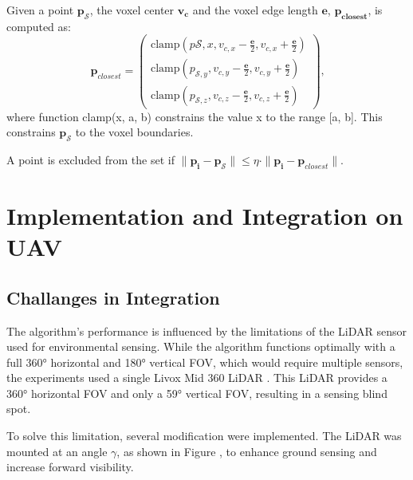             Given a point $\mathbf{p_{\mathcal{S}}}$, the voxel center $\mathbf{v_c}$ and the voxel edge length $\mathbf{e}$, $\mathbf{p_{closest}}$, is computed as: 
            \begin{equation}
                \mathbf{p}_{closest} =
                \begin{pmatrix}
                    \text{clamp}(p{\mathcal{S},x}, v_{c,x} - \frac{\mathbf{e}}{2}, v_{c,x} + \frac{\mathbf{e}}{2}) \\
                    \text{clamp}(p_{\mathcal{S},y}, v_{c,y} - \frac{\mathbf{e}}{2}, v_{c,y} + \frac{\mathbf{e}}{2}) \\
                    \text{clamp}(p_{\mathcal{S},z}, v_{c,z} - \frac{\mathbf{e}}{2}, v_{c,z} + \frac{\mathbf{e}}{2})
                \end{pmatrix}\text{,}
            \end{equation}
            where function clamp(x, a, b) constrains the value x to the range [a, b].
            This constrains $\mathbf{p_{\mathcal{S}}}$ to the voxel boundaries.

            A point is excluded from the set if $ \| \mathbf{p_i} - \mathbf{p_{\mathcal{S}}} \| \leq \eta \cdot \| \mathbf{p_i} - \mathbf{p}_{closest}\|$.
            

    \section{Implementation and Integration on UAV}
        \subsection{Challanges in Integration}
            The algorithm's performance is influenced by the limitations of the \ac{LiDAR} sensor used for environmental sensing. 
            While the algorithm functions optimally with a full 360° horizontal and 180° vertical \ac{FOV}, which would require multiple sensors, the experiments used a single Livox Mid 360 \ac{LiDAR} \cite{livox_mid360}. 
            This \ac{LiDAR} provides a 360° horizontal \ac{FOV} and only a 59° vertical \ac{FOV}, resulting in a sensing blind spot.

            To solve this limitation, several modification were implemented. 
            The \ac{LiDAR} was mounted at an angle $\gamma$, as shown in Figure , to enhance ground sensing and increase forward visibility.

